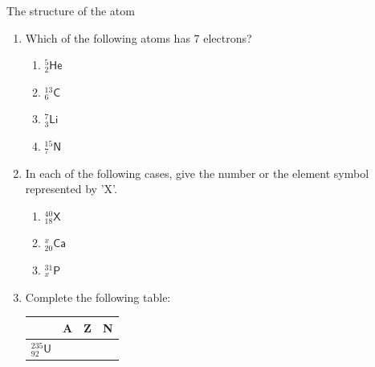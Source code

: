 \begin{exercises}{The structure of the atom}
\begin{enumerate}[noitemsep, label=\textbf{\arabic*}. ]
For the element $_{17}^{35}\mathsf{Cl}$, give the number of ...
\label{m38745*id256843}\begin{enumerate}[noitemsep, label=\textbf{\alph*}. ] 
            \label{m38745*uid25}\item protons
\label{m38745*uid26}\item neutrons
\label{m38745*uid27}\item electrons
\end{enumerate}
... in the atom.\newline
\label{m38745*uid28}\item Which of the following atoms has 7 electrons?
\label{m38745*id256898}\begin{enumerate}[noitemsep, label=\textbf{\alph*}. ] 
            \label{m38745*uid29}\item $_{2}^{5}\mathsf{He}$
\label{m38745*uid30}\item $_{6}^{13}\mathsf{C}$
\label{m38745*uid31}\item $_{3}^{7}\mathsf{Li}$
\label{m38745*uid32}\item $_{7}^{15}\mathsf{N}$
\end{enumerate}
                \label{m38745*uid33}\item 
In each of the following cases, give the number or the element symbol represented by 'X'.
\label{m38745*id257023}\begin{enumerate}[noitemsep, label=\textbf{\alph*}. ] 
            \label{m38745*uid34}\item $_{18}^{40}\mathsf{X}$
\label{m38745*uid35}\item $_{20}^{x}\mathsf{Ca}$
\label{m38745*uid36}\item $_{x}^{31}\mathsf{P}$
\end{enumerate}
                \label{m38745*uid37}\item 
Complete the following table:
          \begin{table}[H]
        \begin{center}
      \label{m38745*id257121}
    \noindent
      \begin{tabular}{|l|l|l|l|}\hline
         &
        \textbf{A} &
        \textbf{Z} &
        \textbf{N} \\ \hline
        $_{92}^{235}\mathsf{U}$ &
         &
         &
        \\ \hline

\end{tabular}
\end{center}
\end{table}
\end{enumerate}
\end{exercises}
